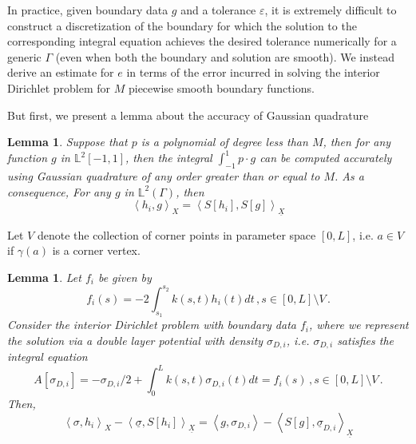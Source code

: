 \documentclass[12pt,times]{elsarticle}
\newcommand{\usigma}{\underline{\sigma}}
\newcommand{\uX}{\underline{X}}
\newtheorem{lemma}[definition]{Lemma}
\begin{document}
{In practice, given boundary data $g$ and a tolerance $\varepsilon$, it is extremely difficult to construct a discretization of the boundary for which the solution to the corresponding integral equation achieves the desired tolerance numerically for a generic $\Gamma$ (even when both the boundary and solution are smooth). 
We instead derive an estimate for $e$ in terms of the error incurred in solving the interior Dirichlet problem for $M$ piecewise smooth boundary functions. 

But first, we present a lemma about the accuracy of Gaussian quadrature
\begin{lemma}
\label{lem:b1}
Suppose that $p$ is a polynomial of degree less than $M$, then for any function $g$ in $\mathbb{L}^{2}[-1,1]$, then the integral
$\int_{-1}^{1} p \cdot g$ can be computed accurately using Gaussian quadrature of any order greater than or equal to $M$.
As a consequence, For any $g$ in $\mathbb{L}^{2}(\Gamma)$, then 
\begin{equation}
\left<h_{i},g \right>_{X} = \left< S[h_{i}], S[g] \right>_{\uX}
\end{equation}
\end{lemma}

Let $V$ denote the collection of corner points in parameter space $[0,L]$, i.e. $a \in V$ if $\gamma(a)$ is a corner vertex.

\begin{lemma}
\label{lem:b2}
Let $f_{i}$ be given by
\begin{equation}
f_{i}(s) = -2 \int_{s_{1}}^{s_{2}} k(s,t) h_{i}(t) dt \, , s\in [0,L] \setminus V \, . \label{eq:deff}
\end{equation}
Consider the interior Dirichlet problem with boundary data $f_{i}$, where we represent the solution via a double layer potential with density $\sigma_{D,i}$, i.e. $\sigma_{D,i}$ satisfies the integral equation
\begin{equation}
A[\sigma_{D,i}] = -\sigma_{D,i}/2 + \int_{0}^{L} k(s,t) \sigma_{D,i}(t) dt  = f_{i}(s) \, , s\in [0,L] \setminus V \, . 
\end{equation}
Then,
\begin{equation}
\left< \sigma, h_{i} \right>_{X} -  \left< \usigma, S[h_{i}] \right>_{\uX} = 
\left< g, \sigma_{D,i} \right> - \left< S[g], \usigma_{D,i} \right>_{\uX}
\end{equation}
\end{lemma}

}
\end{document}
